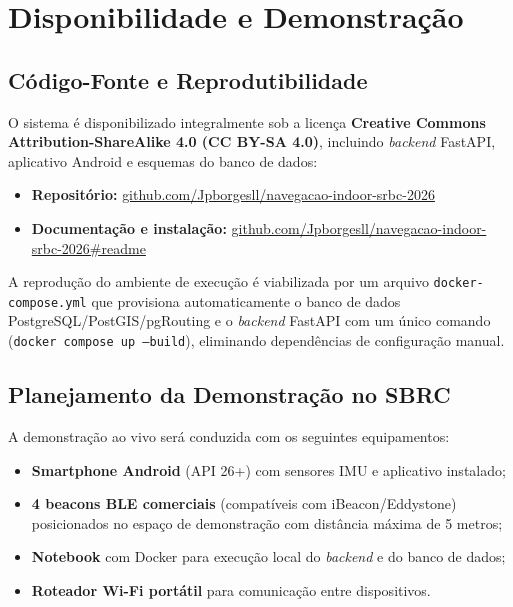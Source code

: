 \documentclass[12pt]{article}
\begin{document}
\section{Disponibilidade e Demonstração}

\subsection{Código-Fonte e Reprodutibilidade}

O sistema é disponibilizado integralmente sob a licença
\textbf{Creative Commons Attribution-ShareAlike 4.0 (CC BY-SA 4.0)},
incluindo \textit{backend} FastAPI, aplicativo Android e esquemas do banco de dados:

\begin{itemize}
  \item \textbf{Repositório:}
        \href{https://github.com/Jpborgesll/navegacao-indoor-srbc-2026}{github.com/Jpborgesll/navegacao-indoor-srbc-2026}
  \item \textbf{Documentação e instalação:}
        \href{https://github.com/Jpborgesll/navegacao-indoor-srbc-2026#readme}{github.com/Jpborgesll/navegacao-indoor-srbc-2026\#readme}
\end{itemize}

A reprodução do ambiente de execução é viabilizada por um arquivo
\texttt{docker-compose.yml} que provisiona automaticamente o banco de dados
PostgreSQL/PostGIS/pgRouting e o \textit{backend} FastAPI com um único comando
(\texttt{docker compose up --build}), eliminando dependências de configuração manual.

\subsection{Planejamento da Demonstração no SBRC}

A demonstração ao vivo será conduzida com os seguintes equipamentos:

\begin{itemize}
  \item \textbf{Smartphone Android} (API 26+) com sensores IMU e aplicativo instalado;
  \item \textbf{4 beacons BLE comerciais} (compatíveis com iBeacon/Eddystone)
        posicionados no espaço de demonstração com distância máxima de 5 metros;
  \item \textbf{Notebook} com Docker para execução local do \textit{backend} e
        do banco de dados;
  \item \textbf{Roteador Wi-Fi portátil} para comunicação entre dispositivos.
\end{itemize}
\end{document}
